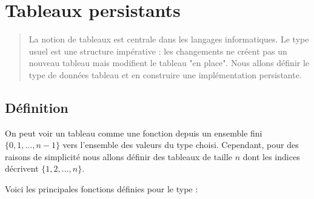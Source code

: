 \chapter{Tableaux persistants}
\thispagestyle{empty}
\begin{abstract}
La notion de tableaux est centrale dans les langages informatiques. Le type usuel est une structure impérative : les changements ne créent pas un nouveau tableau mais modifient le tableau "en place". Nous allons définir le type de données tableau et en construire une implémentation persistante.
\end{abstract}


\section{Définition}
 On peut voir un tableau comme une fonction depuis un ensemble fini $\{0, 1, \ldots, n-1\}$ vers l'ensemble des valeurs du type choisi.  Cependant, pour des raisons de simplicité nous allons définir des tableaux de taille $n$ dont les indices décrivent $\{1, 2, \ldots, n\}$.
 
 Voici les principales fonctions définies pour le type  :

